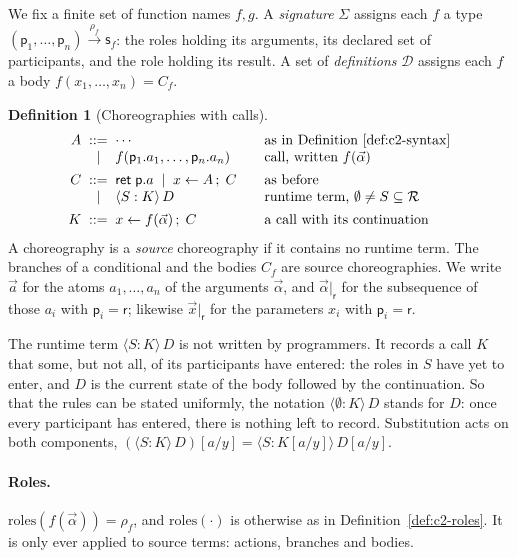 \documentclass[11pt]{report}
\theoremstyle{plain}
\theoremstyle{definition}
\newtheorem{definition}[theorem]{Definition}
\theoremstyle{remark}
\newcommand{\kw}[1]{\mathsf{#1}}
\newcommand{\pp}{\mathsf{p}}
\newcommand{\rr}{\mathsf{r}}
\newcommand{\sr}{\mathsf{s}}
\newcommand{\Roles}{\mathcal{R}}
\newcommand{\bind}[3]{#1 \leftarrow #2\,;\;#3}
\newcommand{\cret}[1]{\kw{ret}\;#1}
\newcommand{\rt}[3]{\langle #1 : #2\rangle\,#3}
\newcommand{\roles}[1]{\mathrm{roles}(#1)}
\newcommand{\Sig}{\Sigma}
\newcommand{\Defs}{\mathcal{D}}
\newcommand{\farr}[3]{(#1) \xrightarrow{#2} #3}
\begin{document}
We fix a finite set of function names $f,g$.  A \emph{signature} $\Sig$
assigns each $f$ a type $\farr{\pp_1,\ldots,\pp_n}{\rho_f}{\sr_f}$: the roles
holding its arguments, its declared set of participants, and the role holding
its result.  A set of \emph{definitions} $\Defs$ assigns each $f$ a body
$f(x_1,\ldots,x_n)=C_f$.

\begin{definition}[Choreographies with calls]\label{def:c3-syntax}
  \[
  \begin{array}{r@{\;\;}c@{\;\;}l@{\qquad}l}
    A & ::= & \cdots & \text{as in Definition~\ref{def:c2-syntax}}\\
      & \mid & f(\pp_1.a_1,\ldots,\pp_n.a_n) & \text{call, written } f(\vec\alpha)\\[1ex]
    C & ::= & \cret{\pp.a} \;\mid\; \bind{x}{A}{C} & \text{as before}\\
      & \mid & \rt{S}{K}{D} & \text{runtime term, } \emptyset\neq S\subseteq\Roles\\[1ex]
    K & ::= & \bind{x}{f(\vec\alpha)}{C} & \text{a call with its continuation}
  \end{array}
  \]
  A choreography is a \emph{source} choreography if it contains no runtime
  term.  The branches of a conditional and the bodies $C_f$ are source
  choreographies.  We write $\vec a$ for the atoms $a_1,\ldots,a_n$ of the
  arguments $\vec\alpha$, and $\vec\alpha|_\rr$ for the subsequence of those
  $a_i$ with $\pp_i=\rr$; likewise $\vec x|_\rr$ for the parameters $x_i$ with
  $\pp_i=\rr$.
\end{definition}

The runtime term $\rt{S}{K}{D}$ is not written by programmers.  It records a
call $K$ that some, but not all, of its participants have entered: the roles
in $S$ have yet to enter, and $D$ is the current state of the body followed by
the continuation.  So that the rules can be stated uniformly, the notation
$\rt{\emptyset}{K}{D}$ stands for $D$: once every participant has entered,
there is nothing left to record.  Substitution acts on both components,
$(\rt{S}{K}{D})[a/y]=\rt{S}{K[a/y]}{D[a/y]}$.

\paragraph{Roles.}
$\roles{f(\vec\alpha)}=\rho_f$, and $\roles{\cdot}$ is otherwise as in
Definition~\ref{def:c2-roles}.  It is only ever applied to source terms:
actions, branches and bodies.
\end{document}
